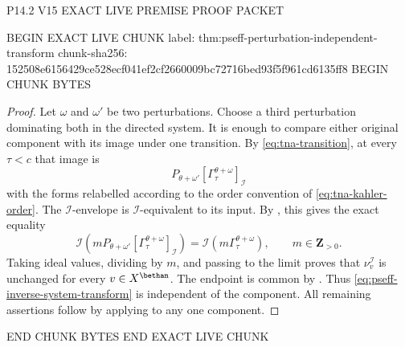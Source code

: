 P14.2 V15 EXACT LIVE PREMISE PROOF PACKET

BEGIN EXACT LIVE CHUNK
label: thm:pseff-perturbation-independent-transform
chunk-sha256: 152508e6156429ce528ecf041ef2cf2660009bc72716bed93f5f961cd6135ff8
BEGIN CHUNK BYTES
\begin{proof}
Let \(\omega\) and \(\omega'\) be two perturbations.  Choose a third
perturbation dominating both in the directed system.  It is enough to
compare either original component with its image under one transition.
By \eqref{eq:tna-transition}, at every \(\tau<c\) that image is
\[
 P_{\theta+\omega'}
 [\Gamma^{\theta+\omega}_\tau]_{\mathcal I}
\tag{71.29}\label{eq:pseff-transition-level}
\]
with the forms relabelled according to the order convention of
\eqref{eq:tna-kahler-order}.  The \(\mathcal I\)-envelope is
\(\mathcal I\)-equivalent to its input.  By
, this gives the exact equality
\[
 \mathcal I\!\left(mP_{\theta+\omega'}
 [\Gamma^{\theta+\omega}_\tau]_{\mathcal I}\right)
 =\mathcal I(m\Gamma^{\theta+\omega}_\tau),
 \qquad m\in\mathbf Z_{>0}.
\tag{71.30}\label{eq:pseff-transition-ideal-equality}
\]
Taking ideal values, dividing by \(m\), and passing to the limit proves
that \(\nu_v^{\mathcal I}\) is unchanged for every
\(v\in X^{\bethan}\).  The endpoint is common by
.  Thus
\eqref{eq:pseff-inverse-system-transform} is independent of the
component.  All remaining assertions follow by applying
 to any one component.
\end{proof}
END CHUNK BYTES
END EXACT LIVE CHUNK
